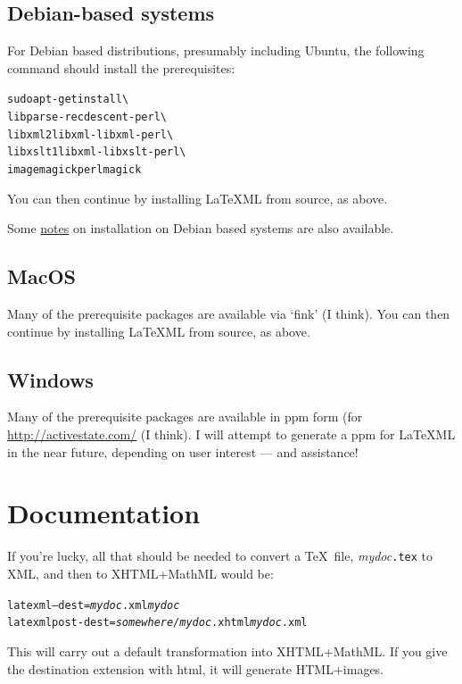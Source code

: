 \documentclass{article}
\begin{document}
\subsection{Debian-based systems}
For Debian based distributions, presumably including Ubuntu, the following
command  should install the prerequisites:
\begin{alltt}
   sudo apt-get install   \textbackslash\\
      libparse-recdescent-perl \textbackslash\\
      libxml2 libxml-libxml-perl \textbackslash\\
      libxslt1 libxml-libxslt-perl  \textbackslash\\
      imagemagick perlmagick
\end{alltt}
You can then continue by installing LaTeXML from source, as above.

Some \href{http://rhaptos.org/devblog/reedstrm/latexml}{notes} on installation on Debian
based systems are also available.

\subsection{MacOS}
Many of the prerequisite packages are available via `fink' (I think).
You can then continue by installing LaTeXML from source, as above.

\subsection{Windows}
Many of the prerequisite packages are available in
ppm form (for \href{ActivePerl}{http://activestate.com/} (I think).
I will attempt to generate a ppm for LaTeXML in the near
future, depending on user interest --- and assistance!

\section{Documentation}\label{docs}
If you're lucky, all that should be needed to convert
a \TeX\ file, \textit{mydoc}\texttt{.tex} to XML, and
then to XHTML+MathML would be:
\begin{alltt}
   latexml --dest=\textit{mydoc}.xml \textit{mydoc}
   latexmlpost -dest=\textit{somewhere/mydoc}.xhtml \textit{mydoc}.xml
\end{alltt}
This will carry out a default transformation into XHTML+MathML.  If you
give the destination extension with html, it will generate HTML+images.
\end{document}
